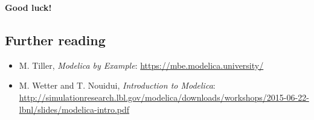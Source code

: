 \documentclass[10pt,a4paper]{article}
\begin{document}
\begin{center}
 \textbf{Good luck!}
\end{center}
\vspace{10 mm}
\subsection*{Further reading}
\begin{itemize}
	\item M. Tiller, \textit{Modelica by Example}: \url{https://mbe.modelica.university/}
	\item M. Wetter and T. Nouidui, \textit{Introduction to Modelica}: \url{http://simulationresearch.lbl.gov/modelica/downloads/workshops/2015-06-22-lbnl/slides/modelica-intro.pdf}
	
\end{itemize}
\end{document}
